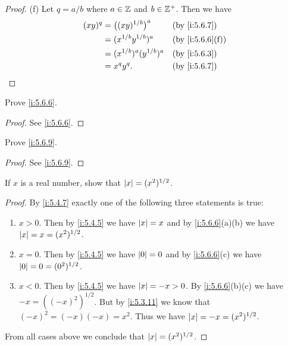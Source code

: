 \begin{proof}{(f)}
  Let \(q = a / b\) where \(a \in \mathbb{Z}\) and \(b \in \mathbb{Z}^+\).
  Then we have
  \begin{align*}
    (xy)^q & = \big((xy)^{1 / b}\big)^a    &  & \by{i:5.6.7}    \\
           & = (x^{1 / b} y^{1 / b})^a     &  & \by{i:5.6.6}[f] \\
           & = (x^{1 / b})^a (y^{1 / b})^a &  & \by{i:5.6.3}    \\
           & = x^q y^q.                    &  & \by{i:5.6.7}
  \end{align*}
\end{proof}

\exercisesection

\begin{ex}\label{i:ex:5.6.1}
  Prove \cref{i:5.6.6}.
\end{ex}

\begin{proof}
  See \cref{i:5.6.6}.
\end{proof}

\begin{ex}\label{i:ex:5.6.2}
  Prove \cref{i:5.6.9}.
\end{ex}

\begin{proof}
  See \cref{i:5.6.9}.
\end{proof}

\begin{ex}\label{i:ex:5.6.3}
  If \(x\) is a real number, show that \(\left\lvert x\right\rvert = (x^2)^{1 / 2}\).
\end{ex}

\begin{proof}
  By \cref{i:5.4.7} exactly one of the following three statements is true:
  \begin{enumerate}
    \item \(x > 0\).
          Then by \cref{i:5.4.5} we have \(\left\lvert x\right\rvert = x\) and by \cref{i:5.6.6}(a)(b) we have \(\left\lvert x\right\rvert = x = (x^2)^{1 / 2}\).
    \item \(x = 0\).
          Then by \cref{i:5.4.5} we have \(\left\lvert0\right\rvert = 0\) and by \cref{i:5.6.6}(c) we have \(\left\lvert0\right\rvert = 0 = (0^2)^{1 / 2}\).
    \item \(x < 0\).
          Then by \cref{i:5.4.5} we have \(\left\lvert x\right\rvert = -x > 0\).
          By \cref{i:5.6.6}(b)(c) we have \(-x = ((-x)^2)^{1 / 2}\).
          But by \cref{i:5.3.11} we know that \((-x)^2 = (-x)(-x) = x^2\).
          Thus we have \(\left\lvert x\right\rvert = -x = (x^2)^{1 / 2}\).
  \end{enumerate}
  From all cases above we conclude that \(\left\lvert x\right\rvert = (x^2)^{1 / 2}\).
\end{proof}
